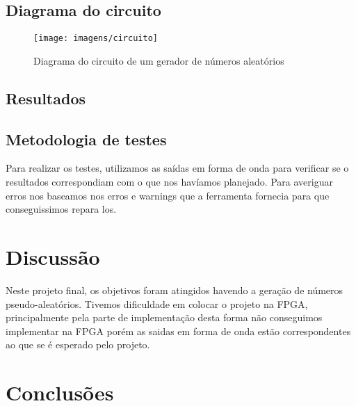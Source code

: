 \documentclass[12pts]{article}
\begin{document}
\clearpage
\subsection{Diagrama do circuito}
\begin{figure}[!htb]
  \centering
  \texttt{[image: imagens/circuito]}
  \caption{Diagrama do circuito de um gerador de números aleatórios}	
  \label{figRotulo}
\end{figure}

\newpage

\subsection{Resultados}

\subsection{Metodologia de testes}
	Para realizar os testes, utilizamos as saídas em forma de onda para verificar se o resultados correspondiam com o que nos havíamos planejado. Para averiguar erros nos baseamos nos erros e warnings que a ferramenta fornecia para que conseguissimos repara los.

\section{Discussão}
\iffalse
Discussão sobre os resultados encontrados, comentando detalhadamente as medições realizadas e dando a devida interpretação destas, informando se os objetivos da experimento foram alcançados. Esta é uma das partes mais importantes do relatório: aqui, há oportunidade para expressar os conhecimentos adquiridos na prática e fazer a interrelação com os fundamentos teóricos.
\fi

        Neste projeto final, os objetivos foram atingidos havendo a geração de números pseudo-aleatórios. Tivemos dificuldade em colocar o projeto na FPGA, principalmente pela parte de implementação desta forma não conseguimos implementar na FPGA porém as saidas em forma de onda estão correspondentes ao que se é esperado pelo projeto.  

\section{Conclusões}
\iffalse
Conclusões, mostrando os êxitos e eventuais problemas encontrados na realização do experimento, indicando as limitações, apresentando recomendações e/ou sugestões.
\fi
\end{document}
